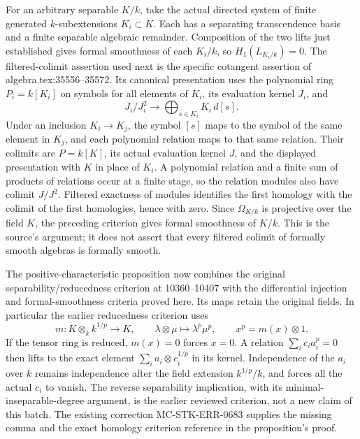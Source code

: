 For an arbitrary separable \(K/k\), take the actual directed system of finite generated \(k\)-subextensions \(K_i\subset K\). Each has a separating transcendence basis and a finite separable algebraic remainder. Composition of the two lifts just established gives formal smoothness of each \(K_i/k\), so \(H_1(L_{K_i/k})=0\). The filtered-colimit assertion used next is the specific cotangent assertion of algebra.\AlgebraIdentifierBreak{}tex:\AlgebraIdentifierBreak{}35556--\AlgebraIdentifierBreak{}35572. Its canonical presentation uses the polynomial ring \(P_i=k[K_i]\) on symbols for all elements of \(K_i\), its evaluation kernel \(J_i\), and \[
 J_i/J_i^2 \longrightarrow \bigoplus_{s\in K_i}K_i\,d[s].
\] Under an inclusion \(K_i\to K_j\), the symbol \([s]\) maps to the symbol of the same element in \(K_j\), and each polynomial relation maps to that same relation. Their colimits are \(P=k[K]\), its actual evaluation kernel \(J\), and the displayed presentation with \(K\) in place of \(K_i\). A polynomial relation and a finite sum of products of relations occur at a finite stage, so the relation modules also have colimit \(J/J^2\). Filtered exactness of modules identifies the first homology with the colimit of the first homologies, hence with zero. Since \(\Omega_{K/k}\) is projective over the field \(K\), the preceding criterion gives formal smoothness of \(K/k\). This is the source's argument; it does not assert that every filtered colimit of formally smooth algebras is formally smooth.

The positive-characteristic proposition now combines the original separability/reducedness criterion at 10360--10407 with the differential injection and formal-smoothness criteria proved here. Its maps retain the original fields. In particular the earlier reducedness criterion uses \[
 m:K\otimes_k k^{1/p}\longrightarrow K,\qquad
 \lambda\otimes\mu\longmapsto\lambda^p\mu^p,
 \qquad x^p=m(x)\otimes1.
\] If the tensor ring is reduced, \(m(x)=0\) forces \(x=0\). A relation \(\sum_i c_i a_i^p=0\) then lifts to the exact element \(\sum_i a_i\otimes c_i^{1/p}\) in its kernel. Independence of the \(a_i\) over \(k\) remains independence after the field extension \(k^{1/p}/k\), and forces all the actual \(c_i\) to vanish. The reverse separability implication, with its minimal-inseparable-degree argument, is the earlier reviewed criterion, not a new claim of this batch. The existing correction MC-\AlgebraIdentifierBreak{}STK-\AlgebraIdentifierBreak{}ERR-\AlgebraIdentifierBreak{}0683 supplies the missing comma and the exact homology criterion reference in the proposition's proof.

